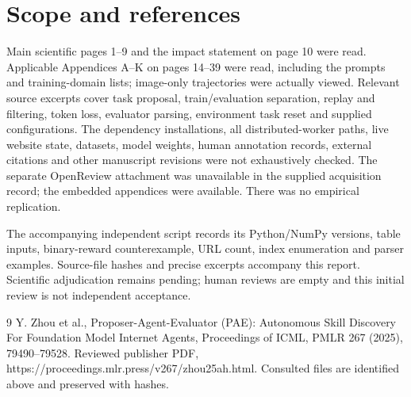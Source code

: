 \documentclass[10pt]{article}
\begin{document}
\section*{Scope and references}
Main scientific pages 1–9 and the impact statement on page 10 were read. Applicable Appendices A–K on pages 14–39 were read, including the prompts and training-domain lists; image-only trajectories were actually viewed. Relevant source excerpts cover task proposal, train/evaluation separation, replay and filtering, token loss, evaluator parsing, environment task reset and supplied configurations. The dependency installations, all distributed-worker paths, live website state, datasets, model weights, human annotation records, external citations and other manuscript revisions were not exhaustively checked. The separate OpenReview attachment was unavailable in the supplied acquisition record; the embedded appendices were available. There was no empirical replication.\par
The accompanying independent script records its Python/NumPy versions, table inputs, binary-reward counterexample, URL count, index enumeration and parser examples. Source-file hashes and precise excerpts accompany this report. Scientific adjudication remains pending; human reviews are empty and this initial review is not independent acceptance.\par
9 Y. Zhou et al., Proposer-Agent-Evaluator (PAE): Autonomous Skill Discovery For Foundation Model Internet Agents, Proceedings of ICML, PMLR 267 (2025), 79490–79528. Reviewed publisher PDF, https://proceedings.mlr.press/v267/zhou25ah.html. Consulted files are identified above and preserved with hashes.\par
\end{document}
